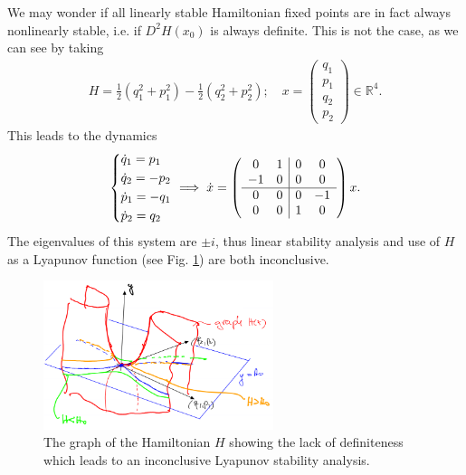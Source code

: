 We may wonder if all linearly stable Hamiltonian fixed points are in fact always nonlinearly stable, i.e. if $D^2H(x_0)$ is always definite. This is not the case, as we can see by taking
 \begin{align}
	 H = \frac{1}{2} \left(q_{1}^{2} + p_{1} ^{2}\right) - \frac{1}{2}\left( q_{2}^{2} + p_{2}^{2}\right);\quad x=
	 \begin{pmatrix}
	 	q_1 \\ p_1 \\ q_2 \\ p_2
	 \end{pmatrix}
	\in \mathbb{R}^{4}. 
\end{align}
This leads to the dynamics
\begin{align}
	\begin{dcases}
		\dot{q}_{1} = p_1 \\
		\dot{q}_2 = - p_2 \\
		\dot{p}_{1} = - q_{1} \\
		\dot{p}_{2} = q_2
	\end{dcases}
	\implies
	\dot{x}=
	\left(
	\begin{array}{ c c | c c}
		0 & 1 & 0 & 0\\
		-1 & 0 & 0 & 0 \\
		\hline
		0 & 0 & 0 & -1 \\
		0 & 0 & 1 & 0
	\end{array} 
	\right)
	x.
\end{align}
The eigenvalues of this system are $\pm i$, thus linear stability analysis and use of $H$ as a Lyapunov function (see Fig. \ref{fig:inconclusive_hamiltonian}) are both inconclusive.
\begin{figure}[h!]
	\centering
	\includegraphics[width=0.6\textwidth]{figures/ch8/18inconclusive_hamiltonian.png}
	\caption{The graph of the Hamiltonian $H$ showing the lack of definiteness which leads to an inconclusive Lyapunov stability analysis.}
	\label{fig:inconclusive_hamiltonian}
\end{figure}

